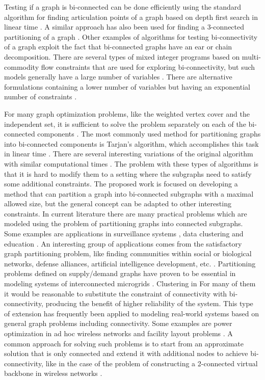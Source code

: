 Testing if a graph is bi-connected can be done efficiently using the standard algorithm for finding articulation points of a graph based on depth first search  in linear time \citep{hopcroft1973algorithm}. A similar approach has also been used for finding a 3-connected partitioning of  a graph \citep{TriConnected}. Other examples of algorithms for testing bi-connectivity of a graph  exploit the fact that bi-connected graphs have an ear  \citep{EarDecomposition} or  chain  \citep{schmidt2013simple} decomposition.  
There are several types of mixed integer programs based on multi-commodity flow constraints that are used for exploring bi-connectivity, but such models generally have a large number of variables \citep{MorganG08}. There are alternative formulations containing a lower number of variables but having an exponential number of constraints \citep{doForte2013415,buchanan2015integer}.  


For many graph optimization problems, like the weighted vertex cover and the independent set, it is sufficient to solve the problem separately on each of the bi-connected components \citep{HOCHBAUM1993203}.  The most commonly used method for partitioning graphs into bi-connected components is Tarjan's algorithm, which accomplishes this task  in linear time \citep{tarjan1972depth}. There are several interesting variations of the original algorithm with similar computational times \citep{Pearce201647}. The problem with these types of algorithms is that it is hard to modify them to a setting where the subgraphs need to satisfy some additional constraints.
  The proposed work is focused on developing a method that can partition a graph into bi-connected subgraphs with a maximal allowed size, but the general concept can be adapted to other interesting constraints.   In current literature there are many practical problems which are modeled using the problem of partitioning graphs into connected subgraphs. 
Some examples are applications in surveillance systems \citep{Borra2015227}, data clustering \citep{shafique2004partitioning} and education \citep{matic2012maximally}. An interesting group of applications comes from the satisfactory graph partitioning problem, like finding communities within social or biological networks,  defense alliances, artificial intelligence development, etc. \citep{Bazgan2010271}. Partitioning problems defined on supply/demand graphs have proven to be essential in modeling systems of interconnected microgrids   \citep{SelAdeq,SelHea,BalancedGSD,SupDem,MIPGSD,Parametric,Tree4}. Clustering in 
   For many of them it would be reasonable to substitute the constraint of connectivity with bi-connectivity, producing the benefit of higher reliability of the system.  This type of extension has frequently been applied  to modeling real-world systems based on general  graph problems  including connectivity. Some examples are power optimization in ad hoc wireless  networks \citep{Moraes20133188} and facility layout problems \citep{Goldschmidt199697}.  A common approach for solving such problems is to start from an approximate solution that is only connected  and extend it with additional  nodes to achieve bi-connectivity, like in the case of the problem of constructing a 2-connected virtual backbone in wireless networks     \citep{BackBone}. 

